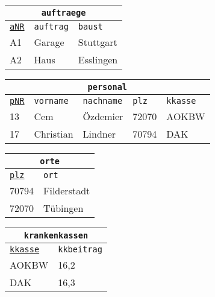 \begin{Answer}[ref=Normal1]
	\begin{minipage}{\textwidth}
		\begin{minipage}{0.33\textwidth}
			\begin{tabular}{lll}
				\multicolumn{3}{c}{\lstinline!auftraege!}\\
				\hline
				\underline{\lstinline!aNR!}&\lstinline!auftrag!&\lstinline!baust!\\
				\hline
				A1&Garage&Stuttgart\\
				A2&Haus&Esslingen\\
			\end{tabular}
		\end{minipage}
		\begin{minipage}{0.66\textwidth}
			\begin{tabular}{lllll}
				\multicolumn{5}{c}{\lstinline!personal!}\\
				\hline
				\underline{\lstinline!pNR!}&\lstinline!vorname!&\lstinline!nachname!&\lstinline!plz!&\lstinline!kkasse!\\
				\hline
				13&Cem&Özdemier&72070&AOKBW\\
				17&Christian&Lindner&70794&DAK\\
			\end{tabular}
		\end{minipage}
	\end{minipage}
	\begin{minipage}{\textwidth}
		\begin{minipage}{0.33\textwidth}
			\begin{tabular}{ll}
				\multicolumn{2}{c}{\lstinline!orte!}\\
				\hline
				\underline{\lstinline!plz!}&\lstinline!ort!\\
				\hline
				70794&Filderstadt\\
				72070&Tübingen\\
			\end{tabular}
		\end{minipage}
		\begin{minipage}{0.66\textwidth}
			\begin{tabular}{ll}
				\multicolumn{2}{c}{\lstinline!krankenkassen!}\\
				\hline
				\underline{\lstinline!kkasse!}&\lstinline!kkbeitrag!\\
				\hline
				AOKBW&16,2\\
				DAK&16,3\\
			\end{tabular}
		\end{minipage}
	\end{minipage}
\end{Answer}
